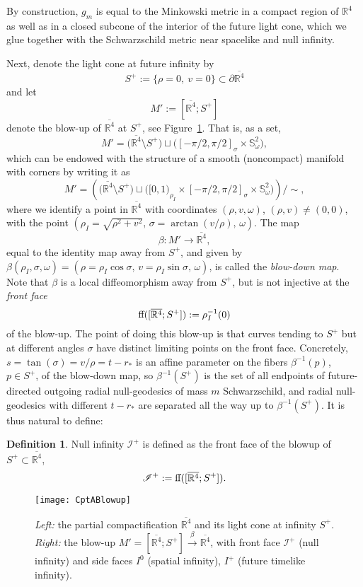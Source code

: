 \documentclass[reqno,11pt,letterpaper]{amsart}
\numberwithin{equation}{section}
\numberwithin{figure}{section}
\theoremstyle{definition}
\newtheorem{definition}[thm]{Definition}
\theoremstyle{remark}
\newcommand{\ms}{\mathscr}
\newcommand{\scri}{\ms I}
\newcommand{\R}{\mathbb{R}}
\newcommand{\Sph}{\mathbb{S}}
\newcommand{\ff}{\tn{ff}}
\newcommand{\ol}{\overline}
\newcommand{\pa}{\partial}
\newcommand{\tn}{\textnormal}
\newcommand{\xra}{\xrightarrow}
\begin{document}
By construction, $g_m$ is equal to the Minkowski metric in a compact region of $\R^4$ as well as in a closed subcone of the interior of the future light cone, which we glue together with the Schwarzschild metric near spacelike and null infinity.

Next, denote the light cone at future infinity by
\begin{equation}
\label{EqCptASplus}
  S^+ := \{ \rho=0,\ v=0 \} \subset \pa\ol{\R^4}
\end{equation}
and let
\[
  M' := [\ol{\R^4};S^+]
\]
denote the blow-up of $\ol{\R^4}$ at $S^+$, see Figure~\ref{FigCptABlowup}. That is, as a set,
\[
  M'=\bigl(\ol{\R^4}\setminus S^+\bigr) \sqcup \bigl([-\pi/2,\pi/2]_\sigma \times\Sph^2_\omega\bigr),
\]
which can be endowed with the structure of a smooth (noncompact) manifold with corners by writing it as
\[
  M' = \left(\bigl(\ol{\R^4}\setminus S^+\bigr) \sqcup \bigl([0,1)_{\rho_I}\times[-\pi/2,\pi/2]_\sigma \times \Sph^2_\omega\bigr)\right) / \sim,
\]
where we identify a point in $\ol{\R^4}$ with coordinates $(\rho,v,\omega)$, $(\rho,v)\neq(0,0)$, with the point $(\rho_I=\sqrt{\rho^2+v^2},\,\sigma=\arctan(v/\rho),\,\omega)$. The map
\begin{equation}
\label{EqCptABlowdown}
  \beta \colon M' \to \ol{\R^4},
\end{equation}
equal to the identity map away from $S^+$, and given by $\beta(\rho_I,\sigma,\omega)=(\rho=\rho_I\cos\sigma,\,v=\rho_I\sin\sigma,\,\omega)$, is called the \emph{blow-down map}. Note that $\beta$ is a local diffeomorphism away from $S^+$, but is not injective at the \emph{front face}
\[
  \ff([\ol{\R^4};S^+]) := \rho_I^{-1}(0)
\]
of the blow-up. The point of doing this blow-up is that curves tending to $S^+$ but at different angles $\sigma$ have distinct limiting points on the front face. Concretely, $s=\tan(\sigma)=v/\rho=t-r_*$ is an affine parameter on the fibers $\beta^{-1}(p)$, $p\in S^+$, of the blow-down map, so $\beta^{-1}(S^+)$ is the set of all endpoints of future-directed outgoing radial null-geodesics of mass $m$ Schwarzschild, and radial null-geodesics with different $t-r_*$ are separated all the way up to $\beta^{-1}(S^+)$. It is thus natural to define:
\begin{definition}
\label{DefCptAScri}
  Null infinity $\scri^+$ is defined as the front face of the blowup of $S^+\subset\ol{\R^4}$,
  \[
    \scri^+ := \ff([\ol{\R^4};S^+]).
  \]
\end{definition}

\begin{figure}[!ht]
\texttt{[image: CptABlowup]}
\caption{\textit{Left:} the partial compactification $\ol{\R^4}$ and its light cone at infinity $S^+$. \textit{Right:} the blow-up $M'=[\ol{\R^4};S^+]\xra{\beta}\ol{\R^4}$, with front face $\scri^+$ (null infinity) and side faces $I^0$ (spatial infinity), $I^+$ (future timelike infinity).}
\label{FigCptABlowup}
\end{figure}
\end{document}
